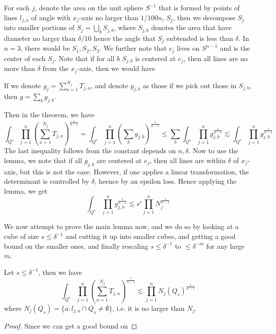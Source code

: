 For each $j$, denote the area on the unit sphere $S^{-1}$ that is formed by points of lines $l_{j,a}$ of angle with $x_j$-axis no larger than $1/100n$, $S_j$, then we decompose $S_j$ into smaller portions of $S_j=\bigcup_b S_{j,b}$, where $S_{j,b}$ denotes the area that have diameter no larger than $\delta/10$ hence the angle that $S_j$ subtended is less than $\delta$. In $n=3$, there would be $S_1, S_2, S_3$. We further note that $e_j$ lives on $S^{n-1}$ and is the center of each $S_j$. Note that if for all $b$ $S_{j,b}$ is centered at $e_j$, then all lines are no more than $\delta$ from the $x_j$-axis, then we would have

If we denote $g_j=\sum_{a=1}^{N_j}T_{j,a}$, and denote $g_{j,b}$ as those if we pick out those in $S_{j,b}$, then $g=\sum_{b}g_{j,b}$.

Then in the theorem, we have
\begin{equation*}
    \int_{Q^s}\prod_{j=1}^n\left(\sum_{a=1}^{N_j}T_{j,a}\right)^{\frac{1}{n-1}}=\int_{Q^s}\prod_{j=1}^n\left(\sum_bg_{j,b}\right)^{\frac{1}{n-1}}\leq\sum_b\int_{Q^s}\prod_{j=1}^n g_{j,b}^{\frac{1}{n-1}}\lesssim \int_{Q^s}\prod_{j=1}^ng_{j,b}^{\frac{1}{n-1}}
\end{equation*}
The last inequality follows from the constant depends on $n, \delta$. Now to use the lemma, we note that if all $g_{j,b}$ are centered at $e_j$, then all lines are within $\delta$ of $x_j$-axis, but this is not the case. However, if one applies a linear transformation, the determinant is controlled by $\delta$, heence by an epsilon loss. Hence applying the lemma, we get
\begin{equation*}
    \int_{Q^s}\prod_{j=1}^ng_{j,b}^{\frac{1}{n-1}}\lesssim s^\epsilon\prod_{j=1}^nN_j^{\frac{1}{n-1}}
\end{equation*}

We now attempt to prove the main lemma now, and we do so by looking at a cube of size $s\leq\delta^{-1}$ and cutting it up into smaller cubes, and getting a good bound on the smaller ones, and finally rescaling $s\leq\delta^{-1}$ to $\leq\delta^{-m}$ for any large $m$. 

\begin{lemma}
    Let $s\leq\delta^{-1}$, then we have
    \begin{equation*}
        \int_{Q^s}\prod_{j=1}^n\left(\sum_{a=1}^{N_j}T_{j,a}\right)^{\frac{1}{n-1}}\lesssim \prod_{j=1}^nN_j(Q_s)^{\frac{1}{n-1}}
    \end{equation*}
    where $N_j(Q_s)=\{a: l_{j,a}\cap Q_s\neq\emptyset \}$, i.e. it is no larger than $N_j$.
\end{lemma}
\begin{proof}
    Since we can get a good bound on 
\end{proof}